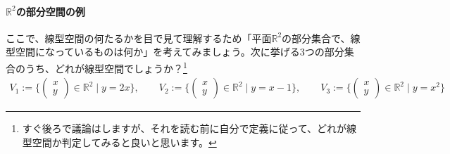 \paragraph{$\mathbb{R}^2$の部分空間の例} ここで、線型空間の何たるかを目で見て理解するため「平面$\mathbb{R}^2$の部分集合で、線型空間になっているものは何か」を考えてみましょう。次に挙げる$3$つの部分集合のうち、どれが線型空間でしょうか？\footnote{すぐ後ろで議論はしますが、それを読む前に自分で定義に従って、どれが線型空間か判定してみると良いと思います。}
\begin{align*}
V_1 := \biggl\{ \begin{pmatrix} x \\ y \end{pmatrix} \in \mathbb{R}^2 \mid y = 2x \biggr\}, \qquad
V_2 := \biggl\{ \begin{pmatrix} x \\ y \end{pmatrix} \in \mathbb{R}^2 \mid y = x - 1 \biggr\}, \qquad
V_3 := \biggl\{ \begin{pmatrix} x \\ y \end{pmatrix} \in \mathbb{R}^2 \mid y = x^2 \biggr\}
\end{align*}
